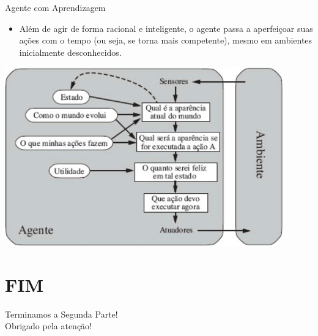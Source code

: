 \documentclass{libs/ufc_format}
\begin{document}
\begin{frame}{Agente com Aprendizagem}
    \begin{itemize}
        \justifying
        \item Além de agir de forma racional e inteligente, o agente passa a aperfeiçoar suas ações com o tempo (ou seja, se torna mais competente), mesmo em ambientes inicialmente desconhecidos.
    \end{itemize}
    \centering
    \includegraphics[width=0.9\textwidth]{figuras/figura07}
\end{frame}
\section{FIM}

\begin{frame}{}
    \centering
    \Large
    Terminamos a Segunda Parte!\\
    Obrigado pela atenção!
\end{frame}

\end{document}
